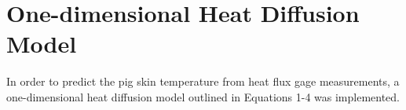 \clearpage		\large
\chapter{One-dimensional Heat Diffusion Model} \label{App:1D_Heat_Diffusion}

 In order to predict the pig skin temperature from heat flux gage measurements, a one-dimensional heat diffusion model outlined in Equations 1-4 was implemented.